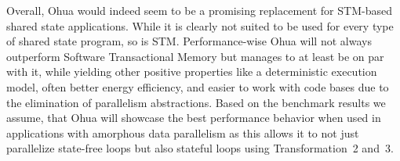 Overall, Ohua would indeed seem to be a promising replacement for STM-based shared state applications.
While it is clearly not suited to be used for every type of shared state program, so is STM.
Performance-wise Ohua will not always outperform Software Transactional Memory but manages to at least be on par with it, while yielding other positive properties like a deterministic execution model, often better energy efficiency, and easier to work with code bases due to the elimination of parallelism abstractions.
Based on the benchmark results we assume, that Ohua will showcase the best performance behavior when used in applications with amorphous data parallelism as this allows it to not just parallelize state-free loops but also stateful loops using Transformation~2 and~3.
